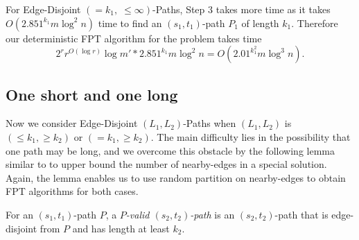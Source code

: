 \documentclass{llncs}
\begin{document}
For {\sc Edge-Disjoint $(= k_1, \; \le \infty)$-Paths}, Step 3 takes more
time as it takes $O(2.851^{k_1} m \log^2 n)$ time to find
an $(s_1, t_1)$-path $P_1$ of length $k_1$.
Therefore our deterministic FPT algorithm for the problem takes time
\[ 2^{r}r^{O(\log r)} \log m' * 2.851^{k_1} m \log^2 n = O(2.01^{k_1^2} m\log^3 n). \]


\subsection{One short and one long}

Now we consider {\sc Edge-Disjoint $(L_1,L_2)$-Paths} when $(L_1,L_2)$ is
$(\le k_1, \ge k_2)$ or $(= k_1, \ge k_2)$.
The main difficulty lies in the possibility that one path may be long, and we
overcome this obstacle by the following lemma similar to 
to upper bound the number of nearby-edges in a special solution.
Again, the lemma enables us to use random partition on nearby-edges to
obtain FPT algorithms for both cases.

For an $(s_1, t_1)$-path $P$, a {\em $P$-valid $(s_2, t_2)$-path} is an $(s_2, t_2)$-path that is edge-disjoint from $P$ and has length at least $k_2$.
\end{document}
